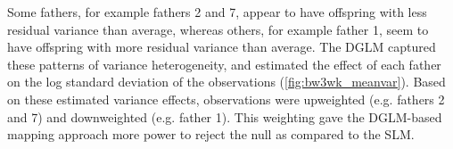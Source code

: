     Some fathers, for example fathers 2 and 7, appear to have offspring with less residual variance than average, whereas others, for example father 1, seem to have offspring with more residual variance than average.
    The DGLM captured these patterns of variance heterogeneity, and estimated the effect of each father on the log standard deviation of the observations (\autoref{fig:bw3wk_meanvar}).
    Based on these estimated variance effects, observations were upweighted (e.g. fathers 2 and 7) and downweighted (e.g. father 1).
    This weighting gave the DGLM-based mapping approach more power to reject the null as compared to the SLM.




